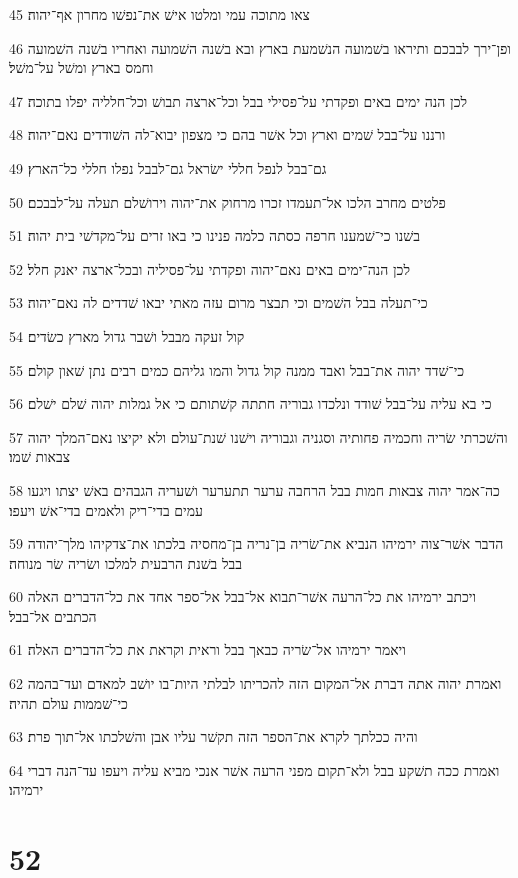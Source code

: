 \par 45 צאו מתוכה עמי ומלטו אישׁ את־נפשׁו מחרון אף־יהוה׃
\par 46 ופן־ירך לבבכם ותיראו בשׁמועה הנשׁמעת בארץ ובא בשׁנה השׁמועה ואחריו בשׁנה השׁמועה וחמס בארץ ומשׁל על־משׁל׃
\par 47 לכן הנה ימים באים ופקדתי על־פסילי בבל וכל־ארצה תבושׁ וכל־חלליה יפלו בתוכה׃
\par 48 ורננו על־בבל שׁמים וארץ וכל אשׁר בהם כי מצפון יבוא־לה השׁודדים נאם־יהוה׃
\par 49 גם־בבל לנפל חללי ישׂראל גם־לבבל נפלו חללי כל־הארץ׃
\par 50 פלטים מחרב הלכו אל־תעמדו זכרו מרחוק את־יהוה וירושׁלם תעלה על־לבבכם׃
\par 51 בשׁנו כי־שׁמענו חרפה כסתה כלמה פנינו כי באו זרים על־מקדשׁי בית יהוה׃
\par 52 לכן הנה־ימים באים נאם־יהוה ופקדתי על־פסיליה ובכל־ארצה יאנק חלל׃
\par 53 כי־תעלה בבל השׁמים וכי תבצר מרום עזה מאתי יבאו שׁדדים לה נאם־יהוה׃
\par 54 קול זעקה מבבל ושׁבר גדול מארץ כשׂדים׃
\par 55 כי־שׁדד יהוה את־בבל ואבד ממנה קול גדול והמו גליהם כמים רבים נתן שׁאון קולם׃
\par 56 כי בא עליה על־בבל שׁודד ונלכדו גבוריה חתתה קשׁתותם כי אל גמלות יהוה שׁלם ישׁלם׃
\par 57 והשׁכרתי שׂריה וחכמיה פחותיה וסגניה וגבוריה וישׁנו שׁנת־עולם ולא יקיצו נאם־המלך יהוה צבאות שׁמו׃
\par 58 כה־אמר יהוה צבאות חמות בבל הרחבה ערער תתערער ושׁעריה הגבהים באשׁ יצתו ויגעו עמים בדי־ריק ולאמים בדי־אשׁ ויעפו׃
\par 59 הדבר אשׁר־צוה ירמיהו הנביא את־שׂריה בן־נריה בן־מחסיה בלכתו את־צדקיהו מלך־יהודה בבל בשׁנת הרבעית למלכו ושׂריה שׂר מנוחה׃
\par 60 ויכתב ירמיהו את כל־הרעה אשׁר־תבוא אל־בבל אל־ספר אחד את כל־הדברים האלה הכתבים אל־בבל׃
\par 61 ויאמר ירמיהו אל־שׂריה כבאך בבל וראית וקראת את כל־הדברים האלה׃
\par 62 ואמרת יהוה אתה דברת אל־המקום הזה להכריתו לבלתי היות־בו יושׁב למאדם ועד־בהמה כי־שׁממות עולם תהיה׃
\par 63 והיה ככלתך לקרא את־הספר הזה תקשׁר עליו אבן והשׁלכתו אל־תוך פרת׃
\par 64 ואמרת ככה תשׁקע בבל ולא־תקום מפני הרעה אשׁר אנכי מביא עליה ויעפו עד־הנה דברי ירמיהו׃

\chapter{52}

